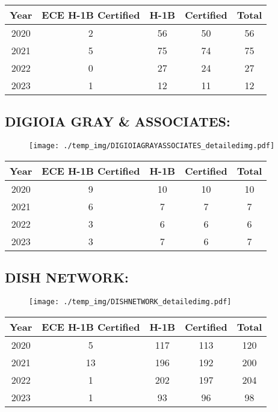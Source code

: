 \documentclass{article}%
\begin{document}
%
\begin{longtable}{c|c|c|c|c}%
\hline%
Year&ECE H{-}1B Certified&H{-}1B&Certified&Total\\%
\hline%
2020&2&56&50&56\\%
\hline%
2021&5&75&74&75\\%
\hline%
2022&0&27&24&27\\%
\hline%
2023&1&12&11&12\\%
\hline%
\end{longtable}

%
\newpage%
\subsection{DIGIOIA GRAY \& ASSOCIATES:}%
\label{subsec:DIGIOIAGRAYASSOCIATES}%
\label{DIGIOIAGRAYASSOCIATESdetailed}%


\begin{figure}[htbp]%
\centering%
\texttt{[image: ./temp\_img/DIGIOIAGRAYASSOCIATES\_detailedimg.pdf]}%
\end{figure}

%
\begin{longtable}{c|c|c|c|c}%
\hline%
Year&ECE H{-}1B Certified&H{-}1B&Certified&Total\\%
\hline%
2020&9&10&10&10\\%
\hline%
2021&6&7&7&7\\%
\hline%
2022&3&6&6&6\\%
\hline%
2023&3&7&6&7\\%
\hline%
\end{longtable}

%
\newpage%
\subsection{DISH NETWORK:}%
\label{subsec:DISHNETWORK}%
\label{DISHNETWORKdetailed}%


\begin{figure}[htbp]%
\centering%
\texttt{[image: ./temp\_img/DISHNETWORK\_detailedimg.pdf]}%
\end{figure}

%
\begin{longtable}{c|c|c|c|c}%
\hline%
Year&ECE H{-}1B Certified&H{-}1B&Certified&Total\\%
\hline%
2020&5&117&113&120\\%
\hline%
2021&13&196&192&200\\%
\hline%
2022&1&202&197&204\\%
\hline%
2023&1&93&96&98\\%
\hline%
\end{longtable}
\end{document}
